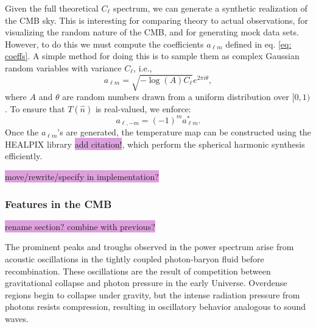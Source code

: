 \documentclass{aa}
\numberwithin{equation}{section}
\numberwithin{table}{section}
\numberwithin{figure}{section}
\begin{document}
Given the full theoretical $C_\ell$ spectrum, we can generate a synthetic realization of the CMB sky. This is interesting for comparing theory to actual observations, for visualizing the random nature of the CMB, and for generating mock data sets. However, to do this we must compute the coefficients $a_{\ell m}$ defined in eq. \eqref{eq: coeffs}.
A simple method for doing this is to sample them as complex Gaussian random variables with variance $C_\ell$, i.e.,
\begin{equation}
    a_{\ell m} = \sqrt{-\log (A) C_\ell} e^{2\pi i \theta},
\end{equation}
where $A$ and $\theta$ are random numbers drawn from a uniform distribution over $[0,1)$. To ensure that $T(\hat{n})$ is real-valued, we enforce:
\begin{equation}
    a_{\ell, -m} = (-1)^m a_{\ell m}^*.
\end{equation}
Once the $a_{\ell m}$'s are generated, the temperature map can be constructed using the HEALPIX library \colorbox{Plum}{add citation!}, which perform the spherical harmonic synthesis efficiently. 

\colorbox{Plum}{move/rewrite/specify in implementation?}


\subsubsection{Features in the CMB}\label{subsubsec: IV theory features}
\colorbox{Plum}{rename section? combine with previous?}

The prominent peaks and troughs observed in the power spectrum arise from acoustic oscillations in the tightly coupled photon-baryon fluid before recombination. These oscillations are the result of competition between gravitational collapse and photon pressure in the early Universe. Overdense regions begin to collapse under gravity, but the intense radiation pressure from photons resists compression, resulting in oscillatory behavior analogous to sound waves.
\end{document}
